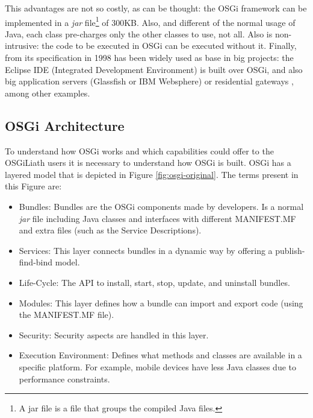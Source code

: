 This advantages are not so
                               costly, as can be thought: the OSGi
                                framework can be implemented in a
                                {\em jar} file\footnote{A jar file is
                                a file that groups the compiled Java
                                files.} of 300KB. Also, and different
                                of the normal usage of Java, each
                                class pre-charges only the other
                                classes to use, not all. Also is
                                non-intrusive: the code to be
                                executed in OSGi can be executed
                                without it. Finally, from its
                                specification in 1998 has been widely
                                used as base in big projects: the
                                Eclipse IDE (Integrated Development
                                Environment) is built over OSGi, and
                                also big application servers
                               (Glassfish or IBM Websphere) or
                               residential gateways
                               \cite{GarciaSanchez2013Gateway}, among other
                               examples. 

\subsection{OSGi Architecture}
To understand how OSGi \cite{Moussa2010Composition} works and which capabilities could offer to the OSGiLiath users it is necessary to understand how OSGi is built. OSGi has a layered model that is depicted in Figure \ref{fig:osgi-original}. The terms present in this Figure are:

\begin{itemize}
\item Bundles: Bundles are the OSGi components made by developers. Is a normal {\em jar} file including Java classes and interfaces with different MANIFEST.MF and extra files (such as the Service Descriptions).
\item Services: This layer connects bundles in a dynamic way by offering a publish-find-bind model.
\item Life-Cycle: The API to install, start, stop, update, and uninstall bundles.
\item Modules: This layer defines how a bundle can import and export code (using the MANIFEST.MF file).
\item Security: Security aspects are handled in this layer.
\item Execution Environment: Defines what methods and classes are available in a specific platform. For example, mobile devices have less Java classes due to performance constraints.
\end{itemize}

